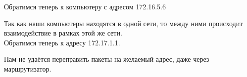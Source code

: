 \documentclass[a4paper,12pt]{article}
\begin{document}
Обратимся теперь к компьютеру с адресом 172.16.5.6
\begin{figure}[H]
\end{figure}
Так как наши компьютеры находятся в одной сети, то между ними происходит 
взаимодействие в рамках этой же сети.\\

Обратимся теперь к адресу 172.17.1.1.
\begin{figure}[H]
\end{figure}
Нам не удаётся переправить пакеты на желаемый адрес, даже через маршрутизатор.\\
\end{document}

